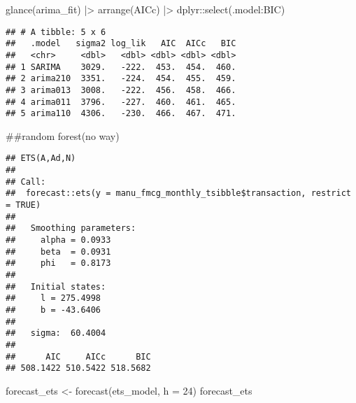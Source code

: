 \documentclass[
]{article}
\newenvironment{Shaded}{\begin{snugshade}}{\end{snugshade}}
\newcommand{\AttributeTok}[1]{\textcolor[rgb]{0.77,0.63,0.00}{#1}}
\newcommand{\ConstantTok}[1]{\textcolor[rgb]{0.00,0.00,0.00}{#1}}
\newcommand{\DecValTok}[1]{\textcolor[rgb]{0.00,0.00,0.81}{#1}}
\newcommand{\FunctionTok}[1]{\textcolor[rgb]{0.00,0.00,0.00}{#1}}
\newcommand{\NormalTok}[1]{#1}
\newcommand{\OtherTok}[1]{\textcolor[rgb]{0.56,0.35,0.01}{#1}}
\newcommand{\SpecialCharTok}[1]{\textcolor[rgb]{0.00,0.00,0.00}{#1}}
\begin{document}
\begin{Shaded}
\begin{Highlighting}[]
\FunctionTok{glance}\NormalTok{(arima\_fit) }\SpecialCharTok{|\textgreater{}} \FunctionTok{arrange}\NormalTok{(AICc) }\SpecialCharTok{|\textgreater{}}\NormalTok{ dplyr}\SpecialCharTok{::}\FunctionTok{select}\NormalTok{(.model}\SpecialCharTok{:}\NormalTok{BIC)}
\end{Highlighting}
\end{Shaded}

\begin{verbatim}
## # A tibble: 5 x 6
##   .model   sigma2 log_lik   AIC  AICc   BIC
##   <chr>     <dbl>   <dbl> <dbl> <dbl> <dbl>
## 1 SARIMA    3029.   -222.  453.  454.  460.
## 2 arima210  3351.   -224.  454.  455.  459.
## 3 arima013  3008.   -222.  456.  458.  466.
## 4 arima011  3796.   -227.  460.  461.  465.
## 5 arima110  4306.   -230.  466.  467.  471.
\end{verbatim}

\#\#random forest(no way)

\begin{Shaded}
\end{Shaded}

\begin{verbatim}
## ETS(A,Ad,N) 
## 
## Call:
##  forecast::ets(y = manu_fmcg_monthly_tsibble$transaction, restrict = TRUE) 
## 
##   Smoothing parameters:
##     alpha = 0.0933 
##     beta  = 0.0931 
##     phi   = 0.8173 
## 
##   Initial states:
##     l = 275.4998 
##     b = -43.6406 
## 
##   sigma:  60.4004
## 
##      AIC     AICc      BIC 
## 508.1422 510.5422 518.5682
\end{verbatim}

\begin{Shaded}
\begin{Highlighting}[]
\NormalTok{forecast\_ets }\OtherTok{\textless{}{-}} \FunctionTok{forecast}\NormalTok{(ets\_model, }\AttributeTok{h =} \DecValTok{24}\NormalTok{)}
\NormalTok{forecast\_ets}
\end{Highlighting}
\end{Shaded}
\end{document}
